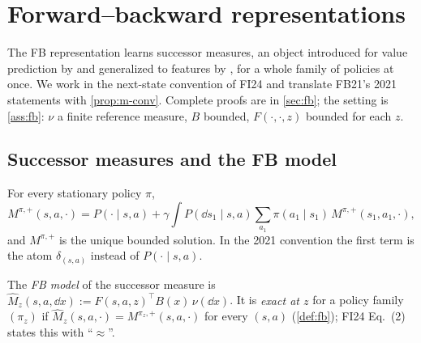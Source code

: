 \section{Forward--backward representations}\label{sec:m-fb}

The FB representation \citep{touati2021fb} learns successor measures, an object introduced for value prediction by \citet{dayan1993successor} and generalized to features by \citet{barreto2017successor}, for a whole family of policies at once.
We work in the next-state convention of FI24 and translate FB21's 2021 statements with \cref{prop:m-conv}. Complete proofs are in \cref{sec:fb}; the setting is \cref{ass:fb}: $\nu$ a finite reference measure, $B$ bounded, $F(\cdot,\cdot,z)$ bounded for each $z$.

\subsection{Successor measures and the FB model}

\begin{proposition}\label{prop:m-fb-bellman}
For every stationary policy $\pi$,
\[
M^{\pi,+}(s,a,\cdot)=P(\cdot\mid s,a)+\gamma\int P(\dd s_1\mid s,a)\sum_{a_1}\pi(a_1\mid s_1)\,M^{\pi,+}(s_1,a_1,\cdot),
\]
and $M^{\pi,+}$ is the unique bounded solution. In the 2021 convention the first term is the atom $\delta_{(s,a)}$ instead of $P(\cdot\mid s,a)$.
\end{proposition}

The \emph{FB model} of the successor measure is $\hat M_z(s,a,\dd x):=F(s,a,z)^\top B(x)\,\nu(\dd x)$.
It is \emph{exact at $z$} for a policy family $(\pi_z)$ if $\hat M_z(s,a,\cdot)=M^{\pi_z,+}(s,a,\cdot)$ for every $(s,a)$ (\cref{def:fb}); FI24 Eq.~(2) states this with ``$\approx$''.

